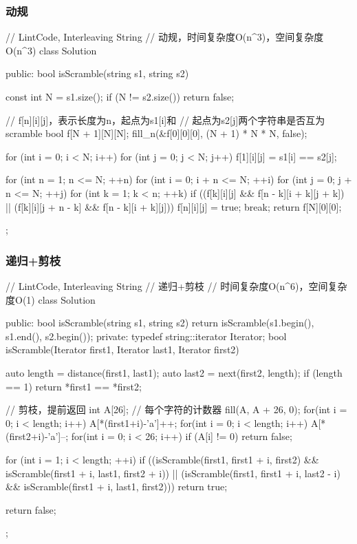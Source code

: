 \subsubsection{动规}
\begin{Code}
// LintCode, Interleaving String
// 动规，时间复杂度O(n^3)，空间复杂度O(n^3)
class Solution {
public:
    bool isScramble(string s1, string s2) {
        const int N = s1.size();
        if (N != s2.size()) return false;

        // f[n][i][j]，表示长度为n，起点为s1[i]和
        // 起点为s2[j]两个字符串是否互为scramble
        bool f[N + 1][N][N];
        fill_n(&f[0][0][0], (N + 1) * N * N, false);

        for (int i = 0; i < N; i++)
            for (int j = 0; j < N; j++)
                f[1][i][j] = s1[i] == s2[j];

        for (int n = 1; n <= N; ++n) {
            for (int i = 0; i + n <= N; ++i) {
                for (int j = 0; j + n <= N; ++j) {
                    for (int k = 1; k < n; ++k) {
                        if ((f[k][i][j] && f[n - k][i + k][j + k]) ||
                                (f[k][i][j + n - k] && f[n - k][i + k][j])) {
                            f[n][i][j] = true;
                            break;
                        }
                    }
                }
            }
        }
        return f[N][0][0];
    }
};
\end{Code}


\subsubsection{递归+剪枝}
\begin{Code}
// LintCode, Interleaving String
// 递归+剪枝
// 时间复杂度O(n^6)，空间复杂度O(1)
class Solution {
public:
    bool isScramble(string s1, string s2) {
        return isScramble(s1.begin(), s1.end(), s2.begin());
    }
private:
    typedef string::iterator Iterator;
    bool isScramble(Iterator first1, Iterator last1, Iterator first2) {
        auto length = distance(first1, last1);
        auto last2 = next(first2, length);
        if (length == 1) return *first1 == *first2;

        // 剪枝，提前返回
        int A[26]; // 每个字符的计数器
        fill(A, A + 26, 0);
        for(int i = 0; i < length; i++) A[*(first1+i)-'a']++;
        for(int i = 0; i < length; i++) A[*(first2+i)-'a']--;
        for(int i = 0; i < 26; i++) if (A[i] != 0) return false;

        for (int i = 1; i < length; ++i)
            if ((isScramble(first1, first1 + i, first2)
                 && isScramble(first1 + i, last1, first2 + i))
                    || (isScramble(first1, first1 + i, last2 - i)
                            && isScramble(first1 + i, last1, first2)))
                return true;

        return false;
    }
};
\end{Code}


